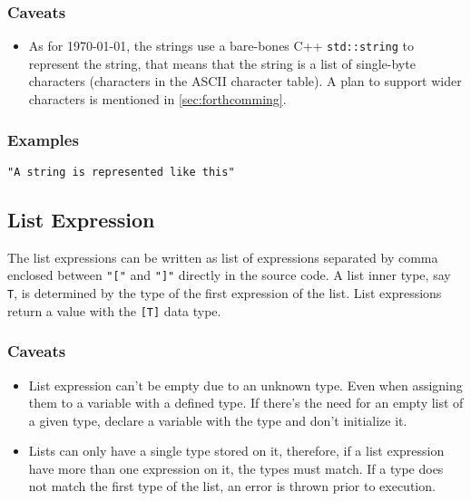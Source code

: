 \subsubsection{Caveats}

\begin{itemize}
    \item As for \today, the strings use a bare-bones C++ \texttt{std::string} to represent the string, that means that the string
        is a list of single-byte characters (characters in the ASCII character table). A plan to support wider characters is mentioned
        in \autoref{sec:forthcomming}.
\end{itemize}

\subsubsection{Examples}

\begin{lstlisting}
"A string is represented like this"
\end{lstlisting}

\subsection{List Expression}

The list expressions can be written as list of expressions separated by comma enclosed between \texttt{"["} and \texttt{"]"}
directly in the source code. A list inner type, say \texttt{T}, is determined by the type of the first expression of the list.
List expressions return a value with the \texttt{[T]} data type.

\subsubsection{Caveats}

\begin{itemize}
    \item List expression can't be empty due to an unknown type. Even when assigning them to a variable with a defined type. If there's the
        need for an empty list of a given type, declare a variable with the type and don't initialize it.
    \item Lists can only have a single type stored on it, therefore, if a list expression have more than one expression on it, the types
        must match. If a type does not match the first type of the list, an error is thrown prior to execution.
\end{itemize}

